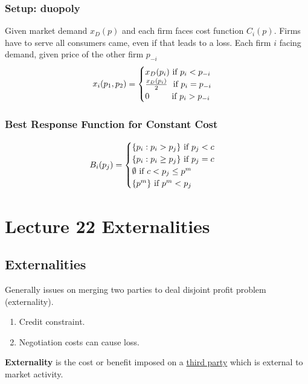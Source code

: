 \documentclass[]{article}
\begin{document}
            \subsubsection{Setup: duopoly}
                \par Given market demand $x_D(p)$ and each firm faces cost function $C_i(p)$. Firms have to serve all consumers came, even if that leads to a loss. Each firm $i$ facing demand, given price of the other firm $p_{-i}$
                \[
                x_i(p_1, p_2) = 
                    \begin{cases}
                        x_D(p_i) \text{{ if }} p_i < p_{-i} \\
                        \frac{x_D(p_i)}{2}\ \text{{ if }} p_i = p_{-i} \\
                        0 \quad \quad \ \text{{ if }} p_i > p_{-i} \\
                    \end{cases}
                \]
                
            \subsubsection{Best Response Function for Constant Cost}
                \[
                    B_i(p_j) = 
                    \begin{cases}
                        \{p_i: p_i > p_j\} \text{{ if }} p_j < c \\
                        \{p_i: p_i \geq p_j \} \text{{ if }} p_j = c \\
                        \emptyset \text{{ if }} c < p_j \leq p^m \\
                        \{p^m\} \text{{ if }} p^m < p_j \\
                    \end{cases}
                \]
    \section{Lecture 22 Externalities}
        \subsection{Externalities}
            \par Generally issues on merging two parties to deal disjoint profit problem (externality).
                \begin{enumerate}
                    \item Credit constraint.
                    \item Negotiation costs can cause loss.
                \end{enumerate}
            \begin{definition}
                \textbf{Externality} is the cost or benefit imposed on a \ul{third party} which is external to market activity.
            \end{definition}
            
\end{document}
